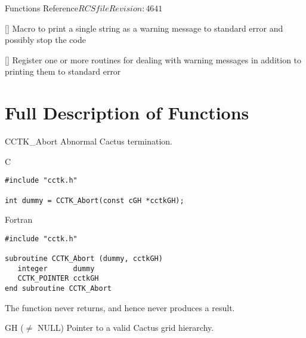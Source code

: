 \begin{cactuspart}{ Functions Reference}{$RCSfile$}{$Revision: 4641 $}
\begin{Lentry}
\item[\code{CCTK\_WARN}] [\pageref{CCTK-WARN}]
  Macro to print a single string as a warning message to standard error and
  possibly stop the code

\item[\code{CCTK\_WarnCallbackRegister}] [\pageref{CCTK-WARNCallbackRegister}]
  Register one or more routines for dealing with warning messages in addition
  to printing them to standard error

\end{Lentry}


\chapter{Full Description of Functions}


\begin{FunctionDescription}{CCTK\_Abort}
\label{CCTK-Abort}
Abnormal Cactus termination.

\begin{SynopsisSection}
\begin{Synopsis}{C}
\begin{verbatim}
#include "cctk.h"

int dummy = CCTK_Abort(const cGH *cctkGH);
\end{verbatim}
\end{Synopsis}
\begin{Synopsis}{Fortran}
\begin{verbatim}
#include "cctk.h"

subroutine CCTK_Abort (dummy, cctkGH)
   integer      dummy
   CCTK_POINTER cctkGH
end subroutine CCTK_Abort
\end{verbatim}
\end{Synopsis}
\end{SynopsisSection}

\begin{ResultSection}
\begin{Result}{}
The function never returns, and hence never produces a result.
\end{Result}
\end{ResultSection}

\begin{ParameterSection}
\begin{Parameter}{GH ($\ne$ NULL)}
Pointer to a valid Cactus grid hierarchy.
\end{Parameter}
\end{ParameterSection}


\end{FunctionDescription}
\end{cactuspart}
